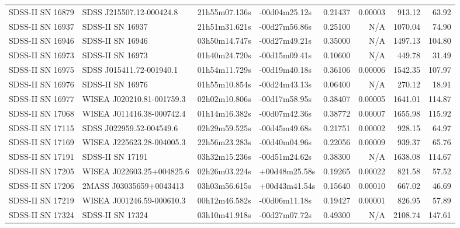 \begin{longtable}{llllrrrr}
SDSS-II SN 16879 &        SDSS J215507.12-000424.8 &   21h55m07.136s &   -00d04m25.12s &  0.21437 &  0.00003 &   913.12 &       63.92 \\
SDSS-II SN 16937 &                SDSS-II SN 16937 &   21h51m31.621s &   -00d27m56.86s &  0.25100 &      N/A &  1070.04 &       74.90 \\
SDSS-II SN 16946 &                SDSS-II SN 16946 &   03h50m14.747s &   -00d27m49.21s &  0.35000 &      N/A &  1497.13 &      104.80 \\
SDSS-II SN 16973 &                SDSS-II SN 16973 &   01h40m24.720s &   -00d15m09.41s &  0.10600 &      N/A &   449.78 &       31.49 \\
SDSS-II SN 16975 &        SDSS J015411.72-001940.1 &   01h54m11.729s &   -00d19m40.18s &  0.36106 &  0.00006 &  1542.35 &      107.97 \\
SDSS-II SN 16976 &                SDSS-II SN 16976 &   01h55m10.854s &   -00d24m43.13s &  0.06400 &      N/A &   270.12 &       18.91 \\
SDSS-II SN 16977 &       WISEA J020210.81-001759.3 &   02h02m10.806s &   -00d17m58.95s &  0.38407 &  0.00005 &  1641.01 &      114.87 \\
SDSS-II SN 17068 &       WISEA J011416.38-000742.4 &   01h14m16.382s &   -00d07m42.36s &  0.38772 &  0.00007 &  1655.98 &      115.92 \\
SDSS-II SN 17115 &        SDSS J022959.52-004549.6 &   02h29m59.525s &   -00d45m49.68s &  0.21751 &  0.00002 &   928.15 &       64.97 \\
SDSS-II SN 17169 &       WISEA J225623.28-004005.3 &   22h56m23.283s &   -00d40m04.96s &  0.22056 &  0.00009 &   939.37 &       65.76 \\
SDSS-II SN 17191 &                SDSS-II SN 17191 &   03h32m15.236s &   -00d51m24.62s &  0.38300 &      N/A &  1638.08 &      114.67 \\
SDSS-II SN 17205 &       WISEA J022603.25+004825.6 &   02h26m03.224s &   +00d48m25.58s &  0.19265 &  0.00022 &   821.58 &       57.52 \\
SDSS-II SN 17206 &         2MASS J03035659+0043413 &   03h03m56.615s &   +00d43m41.54s &  0.15640 &  0.00010 &   667.02 &       46.69 \\
SDSS-II SN 17219 &       WISEA J001246.59-000610.3 &   00h12m46.582s &   -00d06m11.18s &  0.19427 &  0.00001 &   826.95 &       57.89 \\
SDSS-II SN 17324 &                SDSS-II SN 17324 &   03h10m41.918s &   -00d27m07.72s &  0.49300 &      N/A &  2108.74 &      147.61 \\

\end{longtable}
